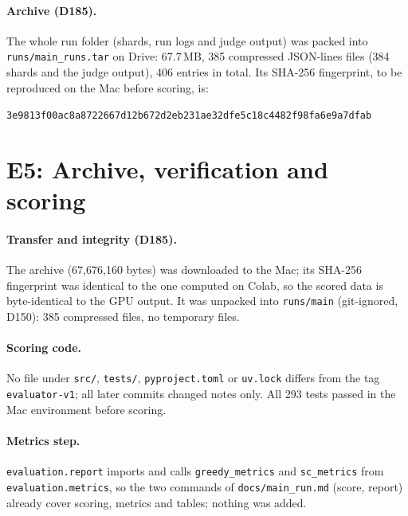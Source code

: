 \documentclass[11pt,a4paper]{report}
\begin{document}
\paragraph{Archive (D185).} The whole run folder (shards, run logs and judge
output) was packed into \texttt{runs/main\_runs.tar} on Drive: 67.7\,MB,
385 compressed JSON-lines files (384 shards and the judge output), 406
entries in total. Its SHA-256 fingerprint, to be reproduced on the Mac
before scoring, is:
\begin{center}\small
\texttt{3e9813f00ac8a8722667d12b672d2eb231ae32dfe5c18c4482f98fa6e9a7dfab}
\end{center}


\section{E5: Archive, verification and scoring}

\paragraph{Transfer and integrity (D185).} The archive (67{,}676{,}160 bytes)
was downloaded to the Mac; its SHA-256 fingerprint was identical to the one
computed on Colab, so the scored data is byte-identical to the GPU output. It
was unpacked into \texttt{runs/main} (git-ignored, D150): 385 compressed
files, no temporary files.

\paragraph{Scoring code.} No file under \texttt{src/}, \texttt{tests/},
\texttt{pyproject.toml} or \texttt{uv.lock} differs from the tag
\texttt{evaluator-v1}; all later commits changed notes only. All 293 tests
passed in the Mac environment before scoring.

\paragraph{Metrics step.} \texttt{evaluation.report} imports and calls
\texttt{greedy\_metrics} and \texttt{sc\_metrics} from
\texttt{evaluation.metrics}, so the two commands of
\texttt{docs/main\_run.md} (score, report) already cover scoring, metrics and
tables; nothing was added.
\end{document}

